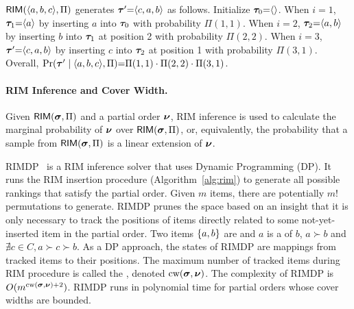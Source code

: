 \begin{example}
    $\mathsf{RIM}(\langle a, b, c \rangle, \Pi)$ generates $\bm{\tau}' {=} \langle c, a, b \rangle$ as follows.
    Initialize $\bm{\tau}_0 {=} \langle  \rangle$. 
    When $i=1$, $\bm{\tau}_1 {=} \langle a \rangle$ by inserting $a$ into $\bm{\tau}_0$ with probability $\Pi(1,1)$. 
    When $i=2$, $\bm{\tau}_2 {=} \langle a, b \rangle$ by inserting $b$ into $\bm{\tau}_1$ at position 2 with probability $\Pi(2,2)$.
    When $i=3$, $\bm{\tau}' {=} \langle c, a, b \rangle$ by inserting $c$ into $\bm{\tau}_2$ at position 1 with probability $\Pi(3,1)$. 
    Overall, $\Pr(\bm{\tau}' \mid \langle a,b,c \rangle, \Pi) {=} \Pi(1,1) \cdot \Pi(2,2) \cdot \Pi(3,1)$.
\end{example}

\paragraph{RIM Inference and Cover Width.}

Given $\mathsf{RIM}(\bm{\sigma}, \Pi)$ and a partial order $\bm{\nu}$, RIM inference is used to calculate the marginal probability of $\bm{\nu}$ over $\mathsf{RIM}(\bm{\sigma}, \Pi)$, or, equivalently, the probability that a sample from $\mathsf{RIM}(\bm{\sigma}, \Pi)$ is a linear extension of $\bm{\nu}$.

RIMDP~\cite{DBLP:conf/aaai/KenigIPKS18} is a RIM inference solver that uses Dynamic Programming (DP).
It runs the RIM insertion procedure (Algorithm~\ref{alg:rim}) to generate all possible rankings that satisfy the partial order. Given $m$ items, there are potentially $m!$ permutations to generate.
RIMDP prunes the space based on an insight that it is only necessary to track the positions of items directly related to some not-yet-inserted item in the partial order.
Two items $\{ a, b \}$ are  and $a$ is a  of $b$, \ifff $a \succ b$ and $\nexists c \in C, a \succ c \succ b$.
As a DP approach, the states of RIMDP are mappings from tracked items to their positions.
The maximum number of tracked items during RIM procedure is called the , denoted $\text{cw}(\bm{\sigma}, \bm{\nu})$.
The complexity of RIMDP is $O(m^{\text{cw}(\bm{\sigma}, \bm{\nu})+2})$. 
RIMDP runs in polynomial time for partial orders whose cover widths are bounded.

